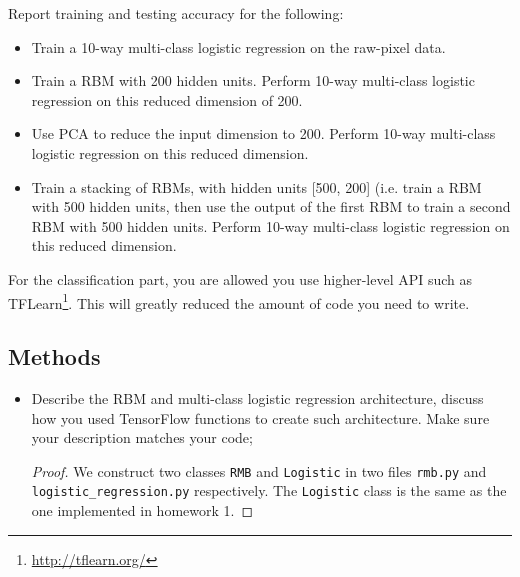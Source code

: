 \documentclass[12pt]{article}
\newcommand{\1}{\mathbf{1}}
\begin{document}
{Report training and testing accuracy for the following:

\begin{itemize}
  \item Train a 10-way multi-class logistic regression on the raw-pixel data.
  \item Train a RBM with 200 hidden units. Perform 10-way multi-class logistic regression on this reduced dimension of 200.
  \item Use PCA to reduce the input dimension to 200. Perform 10-way multi-class logistic regression on this reduced dimension.
  \item Train a stacking of RBMs, with hidden units [500, 200] (i.e. train a RBM with 500 hidden units, then use the output of the first RBM to train a second RBM with 500 hidden units. Perform 10-way multi-class logistic regression on this reduced dimension.
\end{itemize}
For the classification part, you are allowed you use higher-level API such as TFLearn\footnote{\url{http://tflearn.org/}}. This will greatly reduced the amount of code you need to write. 

\subsection{Methods}
\begin{itemize}
  \item Describe the RBM and multi-class logistic regression architecture, discuss how you used TensorFlow functions to create such architecture. Make sure your description matches your code;
  \begin{proof}
    We construct two classes {\tt RMB} and {\tt Logistic} in two files {\tt rmb.py} and {\tt logistic\_regression.py} respectively. The {\tt Logistic} class is the same as the one implemented in homework 1.


\end{proof}
\end{itemize}}
\end{document}
